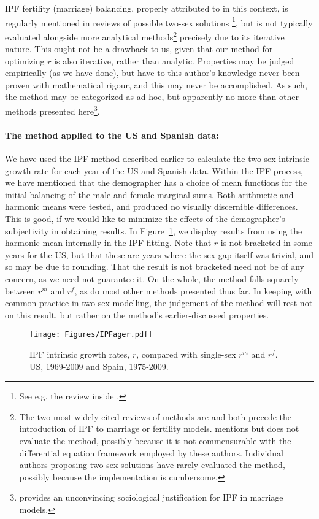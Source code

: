 IPF fertility (marriage) balancing, properly attributed to \citet{mc1975models}
in this context, is regularly mentioned in reviews of possible two-sex solutions \footnote{See e.g.
the review inside \citet{ianelli2005gender}.}, but is not typically
evaluated alongside more analytical
methods\footnote{The two most widely cited
reviews of methods are \citet{keyfitz1972mathematics} and
\citet{pollard1973mathematical} both precede the introduction of IPF to
marriage or fertility models. \citet{ianelli2005gender} mentions but does not
evaluate the method, possibly because it is not commensurable with the
differential equation framework employed by these authors. Individual authors proposing
two-sex solutions have rarely evaluated the method, possibly because the implementation
is cumbersome.} precisely due to its iterative nature. This ought not be a
drawback to us, given that our method for optimizing $r$ is also iterative,
rather than analytic. Properties may be judged empirically (as we have done),
but have to this author's knowledge never been proven with mathematical rigour,
and this may never be accomplished. As such, the method may be categorized as ad
hoc, but apparently no more than other methods presented here\footnote{\citet{mc1975models} 
provides an unconvincing sociological justification for IPF in marriage
models.}.

\paragraph{The method applied to the US and Spanish data:}

We have used the IPF method described earlier to calculate the two-sex intrinsic
growth rate for each year of the US and Spanish data. Within the IPF process, we
have mentioned that the demographer has a choice of mean functions for the
initial balancing of the male and female marginal sums. Both arithmetic and
harmonic means were tested, and produced no visually discernible differences.
This is good, if we would like to minimize the effects of the demographer's
subjectivity in obtaining results. In Figure~\ref{fig:IPFager}, we display
results from using the harmonic mean internally in the IPF fitting. Note that
$r$ is not bracketed in some years for the US, but that these are years where 
the sex-gap itself was trivial, and so may be due to
rounding. That the result is not bracketed need not be of any concern, as we
need not guarantee it. On the whole, the method falls squarely between $r^m$ and
$r^f$, as do most other methods presented thus far. In keeping with common
practice in two-sex modelling, the judgement of the method will rest not on this
result, but rather on the method's earlier-discussed properties.

\begin{figure}[ht!]
        \centering  
          \caption{IPF intrinsic growth rates, $r$, compared with
          single-sex $r^m$ and $r^f$. US, 1969-2009 and Spain, 1975-2009.}
           \texttt{[image: Figures/IPFager.pdf]}
          \label{fig:IPFager}
\end{figure}




\FloatBarrier

